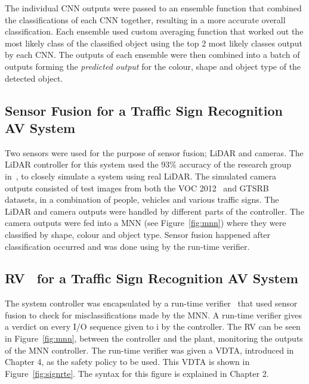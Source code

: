 The individual \ac{CNN} outputs were passed to an ensemble function that combined the classifications of each \ac{CNN} together, resulting in a more accurate overall classification.
Each ensemble used custom averaging function that worked out the most likely class of the classified object using the top 2 most likely classes output by each \ac{CNN}.
The outputs of each ensemble were then combined into a batch of outputs forming the \textit{predicted output} for the colour, shape and object type of the detected object.

\subsection{Sensor Fusion for a Traffic Sign Recognition AV System}
Two sensors were used for the purpose of sensor fusion; \ac{LiDAR} and cameras.
The \ac{LiDAR} controller for this system used the 93\% accuracy of the research group in~\cite{lidarFusion}, to closely simulate a system using real \ac{LiDAR}.
The simulated camera outputs consisted of test images from both the \ac{VOC} 2012~\cite{pascal-voc-2012} and \ac{GTSRB}~\cite{Stallkamp2012-gtsrb} datasets, in a combination of people, vehicles and various traffic signs.
The \ac{LiDAR} and camera outputs were handled by different parts of the controller.
The camera outputs were fed into a \ac{MNN} (see Figure~\ref{fig:mnn}) where they were classified by shape, colour and object type.
Sensor fusion happened after classification occurred and was done using by the run-time verifier.

\subsection{\acf{RV}~\cite{runtime-verify} for a Traffic Sign Recognition AV System}
The system controller was encapsulated by a run-time verifier~\cite{recps} that used sensor fusion to check for misclassifications made by the \ac{MNN}.
A run-time verifier gives a verdict on every I/O sequence given to i by the controller.
The \ac{RV} can be seen in Figure~\ref{fig:mnn}, between the controller and the plant, monitoring the outputs of the \ac{MNN} controller.
The run-time verifier was given a \acf{VDTA}, introduced in Chapter 4, as the safety policy to be used.
This \ac{VDTA} is shown in Figure~\ref{fig:signrte}.
The syntax for this figure is explained in Chapter 2.


